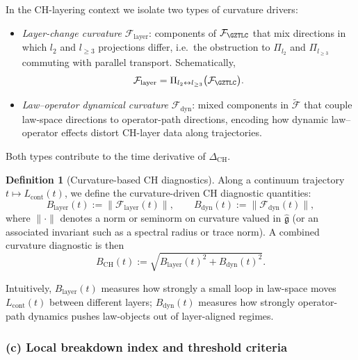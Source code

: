 \documentclass[11pt]{book}
\theoremstyle{plain}
\theoremstyle{definition}
\newtheorem{definition}[theorem]{Definition} \theoremstyle{remark}
\begin{document}
In the CH-layering context we isolate two types of curvature drivers:

\begin{itemize}
  \item \emph{Layer-change curvature} $\mathcal{F}_{\mathrm{layer}}$:
        components of $\mathcal{F}_{\GZTLC}$ that mix directions in
        which $l_2$ and $l_{\ge3}$ projections differ, i.e.\ the
        obstruction to $\Pi_{l_2}$ and $\Pi_{l_{\ge3}}$ commuting with
        parallel transport. Schematically,
        \[
          \mathcal{F}_{\mathrm{layer}}
          =
          \Pi_{l_2\leftrightarrow l_{\ge3}}
          \bigl(\mathcal{F}_{\GZTLC}\bigr).
        \]
  \item \emph{Law--operator dynamical curvature} $\mathcal{F}_{\mathrm{dyn}}$:
        mixed components in $\widetilde{\mathcal{F}}$ that couple
        law-space directions to operator-path directions, encoding how
        dynamic law–operator effects distort CH-layer data along
        trajectories.
\end{itemize}

Both types contribute to the time derivative of $\Delta_{\mathrm{CH}}$.

\begin{definition}[Curvature-based CH diagnostics]
Along a continuum trajectory $t\mapsto L_{\mathrm{cont}}(t)$, we
  define the curvature-driven CH diagnostic quantities:
  \[
    B_{\mathrm{layer}}(t)
    :=
    \bigl\|\mathcal{F}_{\mathrm{layer}}(t)\bigr\|,
    \qquad
    B_{\mathrm{dyn}}(t)
    :=
    \bigl\|\mathcal{F}_{\mathrm{dyn}}(t)\bigr\|,
  \]
  where $\|\cdot\|$ denotes a norm or seminorm on curvature valued in
  $\widehat{\mathfrak{g}}$ (or an associated invariant such as a
  spectral radius or trace norm). A combined curvature diagnostic is
  then
  \[
    B_{\mathrm{CH}}(t)
    :=
    \sqrt{
      B_{\mathrm{layer}}(t)^2
      +
      B_{\mathrm{dyn}}(t)^2
    }.
  \]
\end{definition}

Intuitively, $B_{\mathrm{layer}}(t)$ measures how strongly a small
loop in law-space moves $L_{\mathrm{cont}}(t)$ between different
layers; $B_{\mathrm{dyn}}(t)$ measures how strongly operator-path
dynamics pushes law-objects out of layer-aligned regimes.



\subsubsection*{(c) Local breakdown index and threshold criteria}
\end{document}
